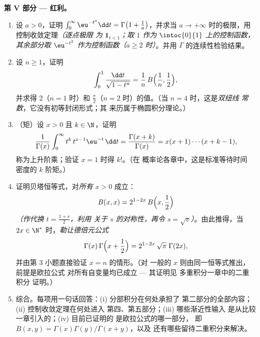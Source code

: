 \begin{problem}
\medskip
\noindent\textbf{第 V 部分 --- 红利。}
\begin{enumerate}[resume]
  \item 设 $a > 0$，证明 $\int_0^\infty \eu^{-t^a}\dd t =
        \Gamma\bigl(1 + \frac1a\bigr)$，并求当
        $a \to +\infty$ 时的极限，用控制收敛定理\emph{（逐点极限
        为 $\mathbf 1_{t < 1}$；取 $1$ 作为 $\intoc{0}{1}$ 上的控制函数，
        其余部分取 $\eu^{-t^2}$ 作为控制函数（$a \geq
        2$ 时）}。并用
        $\Gamma$ 的连续性检验结果。
  \item 设 $n \geq 1$，证明
        \[
        \int_0^1 \frac{\dd t}{\sqrt{1 - t^n}}
        = \frac1n\,B\Bigl(\frac1n, \frac12\Bigr),
        \]
        并求得 $2$（$n = 1$ 时）和 $\frac\pi2$（$n
        = 2$ 时）的值。（当 $n = 4$ 时，这是\emph{双纽线
        常数}，它没有初等封闭形式；其
        来历属于椭圆积分理论。）
  \item （矩）设 $x > 0$ 且 $k \in \N$，证明
        \[
        \frac{1}{\Gamma(x)}\int_0^\infty
        t^{k}\,t^{x-1}\eu^{-t}\,\dd t
        = \frac{\Gamma(x+k)}{\Gamma(x)}
        = x(x+1)\cdots(x+k-1),
        \]
        称为上升阶乘；验证 $x = 1$ 时得 $k!$。（在
        概率论各章中，这是标准等待时间
        密度的 $k$ 阶矩。）
  \item 证明贝塔恒等式，对\emph{所有} $x > 0$ 成立：
        \[
        B(x, x) = 2^{1-2x}\,B\Bigl(x, \frac12\Bigr)
        \]
        \emph{（作代换 $t = \frac{1+s}2$，利用
        关于 $s$ 的对称性，再令 $s = \sqrt v$）}。由此推得，当
        $2x \in \N^*$ 时，\emph{勒让德倍元公式}
        \[
        \Gamma(x)\,\Gamma\Bigl(x + \frac12\Bigr)
        = 2^{1-2x}\,\sqrt\pi\;\Gamma(2x),
        \]
        并由第 3 小题直接验证 $x = n$ 的情形。（对
        一般的 $x$ 则由同一恒等式推出，前提是欧拉公式
        对所有自变量均已成立 --- 其证明见
        多重积分一章中的二重积分
        证明。）
  \item 综合。每项用一句话回答：(i) 分部积分在何处承担了
        第二部分的全部内容；(ii) 控制收敛定理在何处进入
        第四、第五部分；(iii) 哪些渐近性输入
        是从比较一章引入的；(iv) 目前已证明的
        是欧拉公式的哪一部分，
        即 $B(x,y) = \Gamma(x)\Gamma(y)/\Gamma(x+y)$，以及
        还有哪些留待二重积分来解决。
\end{enumerate}
\end{problem}
